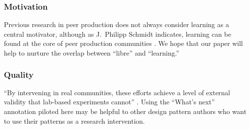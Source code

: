 





\subsubsection*{Motivation}  Previous research in peer production does not always consider learning as
a central motivator, although as J.~Philipp Schmidt indicates, learning can be found at the core of peer production communities \cite{schmidt+commons-based+2009}.  We hope that our paper will help to nurture the overlap between ``libre'' and ``learning.''

\vspace{-.25\baselineskip}

\subsubsection*{Quality} 
``By intervening in real communities, these efforts achieve a level of external validity that lab-based experiments cannot'' \cite{benkler2015peer}.  Using the ``What's next'' annotation piloted here may be helpful to other design pattern authors who want to use their patterns as a research intervention.

